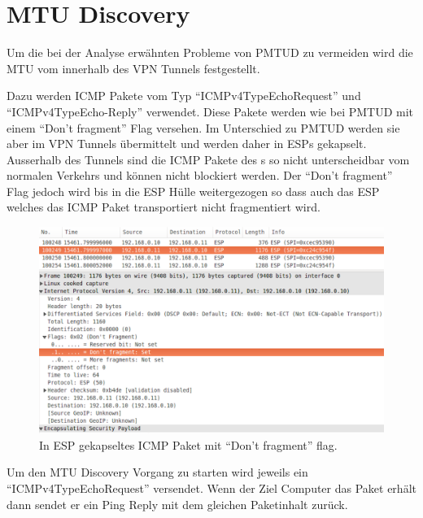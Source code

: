 \cleardoublepage
\section{MTU Discovery}
\label{sec:MTU Discovery}

Um die bei der Analyse erwähnten Probleme von \acs{PMTUD} zu vermeiden wird die \acs{MTU} vom \tool{} innerhalb des \acs{VPN} Tunnels festgestellt.

Dazu werden \acs{ICMP} Pakete vom Typ \enquote{ICMPv4TypeEchoRequest} und \enquote{ICMPv4TypeEcho-Reply} verwendet. Diese Pakete werden wie bei \acs{PMTUD} mit einem \enquote{Don't fragment} Flag versehen. Im Unterschied zu \acs{PMTUD} werden sie aber im \acs{VPN} Tunnels übermittelt und werden daher in \acs{ESP}s gekapselt. Ausserhalb des Tunnels sind die ICMP Pakete des \tool{}s so nicht unterscheidbar vom normalen Verkehrs und können nicht blockiert werden.
Der \enquote{Don't fragment} Flag jedoch wird bis in die \acs{ESP} Hülle weitergezogen so dass auch das \acs{ESP} welches das \acs{ICMP} Paket transportiert nicht fragmentiert wird.

\begin{figure}[H]
    \begin{center}
        \includegraphics[trim=1 0 0 0,clip,width=\textwidth]{mainpart/implementation/img/ESP_DontFragment}
    \end{center}
    \caption{In ESP gekapseltes ICMP Paket mit \enquote{Don't fragment} flag.}
\end{figure}

Um den \acs{MTU} Discovery Vorgang zu starten wird jeweils ein \enquote{ICMPv4TypeEchoRequest} versendet. Wenn der Ziel Computer das Paket erhält dann sendet er ein Ping Reply mit dem gleichen Paketinhalt zurück.

